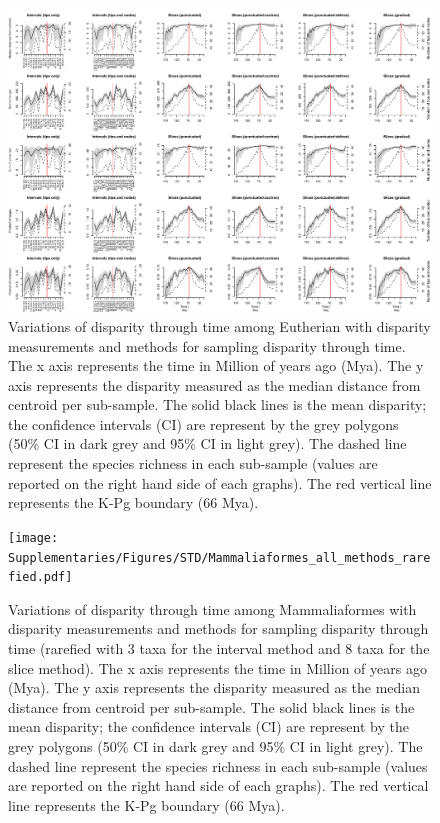 \begin{landscape}
\begin{figure}[!htbp]
\centering
    \includegraphics[width=\textwidth,height=\textheight,keepaspectratio]{Supplementaries/Figures/STD/Eutheria_all_methods.pdf}
\caption[Comparison of all the disparity metrics and all the time series methods for Eutheria]{Variations of disparity through time among Eutherian with disparity measurements and methods for sampling disparity through time. The x axis represents the time in Million of years ago (Mya). The y axis represents the disparity measured as the median distance from centroid per sub-sample. The solid black lines is the mean disparity; the confidence intervals (CI) are represent by the grey polygons (50\% CI in dark grey and 95\% CI in light grey). The dashed line represent the species richness in each sub-sample (values are reported on the right hand side of each graphs). The red vertical line represents the K-Pg boundary (66 Mya).}
\label{Supp_disparity_all_Eutheria}
\end{figure}
\end{landscape}



\begin{landscape}
\begin{figure}[!htbp]
\centering
    \texttt{[image: Supplementaries/Figures/STD/Mammaliaformes\_all\_methods\_rarefied.pdf]}
\caption[Comparison of all the disparity metrics and all the time series methods for Mammaliaformes (rarefied)]{Variations of disparity through time among Mammaliaformes with disparity measurements and methods for sampling disparity through time (rarefied with 3 taxa for the interval method and 8 taxa for the slice method). The x axis represents the time in Million of years ago (Mya). The y axis represents the disparity measured as the median distance from centroid per sub-sample. The solid black lines is the mean disparity; the confidence intervals (CI) are represent by the grey polygons (50\% CI in dark grey and 95\% CI in light grey). The dashed line represent the species richness in each sub-sample (values are reported on the right hand side of each graphs). The red vertical line represents the K-Pg boundary (66 Mya).}
\label{Supp_disparity_all_Mammaliaformes_rarefied}
\end{figure}
\end{landscape}

